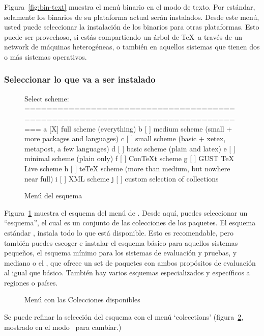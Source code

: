 \documentclass{article}
\begin{document}
Figura~\ref{fig:bin-text} muestra el menú binario en el modo de texto.
Por estándar, solamente los binarios de su plataforma actual serán
instalados. Desde este menú, usted puede seleccionar la instalación de
los binarios para otras plataformas. Esto puede ser provechoso, si
estás compartiendo un árbol de \TeX\ a través de un network de
máquinas heterogéneas, o también en aquellos sistemas que tienen dos o
más sistemas operativos. 

\subsubsection{Seleccionar lo que va a ser instalado}
\label{sec:components}

\begin{figure}[tbh]
\begin{boxedverbatim}
Select scheme:
===============================================================================
 a [X] full scheme (everything)
 b [ ] medium scheme (small + more packages and languages)
 c [ ] small scheme (basic + xetex, metapost, a few languages)
 d [ ] basic scheme (plain and latex)
 e [ ] minimal scheme (plain only)
 f [ ] ConTeXt scheme
 g [ ] GUST TeX Live scheme
 h [ ] teTeX scheme (more than medium, but nowhere near full)
 i [ ] XML scheme
 j [ ] custom selection of collections
\end{boxedverbatim}
\caption{Menú del esquema}\label{fig:scheme-text}
\end{figure}

Figura~\ref{fig:scheme-text} muestra el esquema del menú de \TL. Desde
aquí, puedes seleccionar un ``esquema'', el cual es un conjunto de las
colecciones de los paquetes. El esquema estándar ,
instala todo lo que está disponible. Esto es recomendable, pero
también puedes escoger e instalar el esquema básico 
para aquellos sistemas pequeños, el esquema mínimo 
para los sistemas de evaluación y pruebas, y mediano  o
el , que ofrece un set de paquetes con ambos propósitos
de evaluación al igual que básico. También hay varios esquemas
especializados y específicos a regiones o países.

\begin{figure}[tb]
\centering {}
\caption{Menú con las Colecciones disponibles}\label{fig:collections-gui}
\end{figure}

Se puede refinar la selección del esquema con el menú `colecctions'
(figura~\ref{fig:collections-gui}, mostrado en el modo \GUI\, para
cambiar.)
\end{document}
